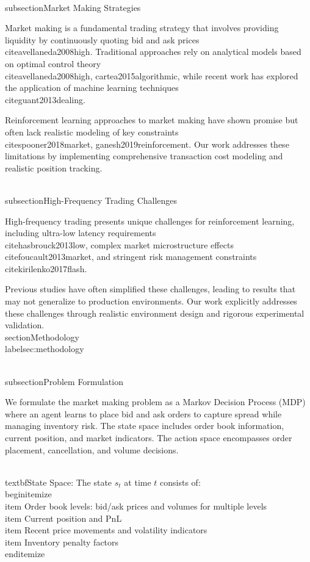 \documentclass[11pt,a4paper]{article}
\begin{document}
\\subsection{Market Making Strategies}

Market making is a fundamental trading strategy that involves providing liquidity by continuously quoting bid and ask prices~\\cite{avellaneda2008high}. Traditional approaches rely on analytical models based on optimal control theory~\\cite{avellaneda2008high, cartea2015algorithmic}, while recent work has explored the application of machine learning techniques~\\cite{guant2013dealing}.

Reinforcement learning approaches to market making have shown promise but often lack realistic modeling of key constraints~\\cite{spooner2018market, ganesh2019reinforcement}. Our work addresses these limitations by implementing comprehensive transaction cost modeling and realistic position tracking.

\\subsection{High-Frequency Trading Challenges}

High-frequency trading presents unique challenges for reinforcement learning, including ultra-low latency requirements~\\cite{hasbrouck2013low}, complex market microstructure effects~\\cite{foucault2013market}, and stringent risk management constraints~\\cite{kirilenko2017flash}.

Previous studies have often simplified these challenges, leading to results that may not generalize to production environments. Our work explicitly addresses these challenges through realistic environment design and rigorous experimental validation.
\n\n
\\section{Methodology}
\\label{sec:methodology}

\\subsection{Problem Formulation}

We formulate the market making problem as a Markov Decision Process (MDP) where an agent learns to place bid and ask orders to capture spread while managing inventory risk. The state space includes order book information, current position, and market indicators. The action space encompasses order placement, cancellation, and volume decisions.

\\textbf{State Space}: The state $s_t$ at time $t$ consists of:
\\begin{itemize}
\\item Order book levels: bid/ask prices and volumes for multiple levels
\\item Current position and PnL
\\item Recent price movements and volatility indicators
\\item Inventory penalty factors
\\end{itemize}
\end{document}

